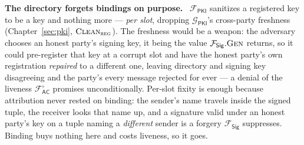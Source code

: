 \documentclass[10pt,oneside,openany]{book}
\newcommand{\op}[1]{\textnormal{\textsc{#1}}}
\newcommand{\Fsig}{\mathcal{F}_{\mathsf{Sig}}}
\newcommand{\Gpki}{\mathcal{G}_{\mathsf{PKI}}}
\newcommand{\Facz}{\mathcal{F}^{\circ}_{\mathsf{AC}}}
\newcommand{\Fpki}{\mathcal{F}_{\mathsf{PKI}}}
\newcommand{\Clean}{\op{Clean}}
\newcommand{\heading}[1]{\medskip\par\noindent\textcolor{accent}{\textbf{#1.}}\ }
\theoremstyle{accentdef}
\theoremstyle{accentplain}
\begin{document}
\heading{The directory forgets bindings on purpose} $\Fpki$ sanitizes a registered key to be a
key and nothing more --- \emph{per slot}, dropping $\Gpki$'s cross-party freshness
(Chapter~\ref{sec:pki}, $\Clean_{\op{reg}}$). The freshness would be a weapon: the adversary
chooses an honest party's signing key, it being the value $\Fsig.\op{Gen}$ returns, so it could
pre-register that key at a corrupt slot and have the honest party's own registration
\emph{repaired} to a different one, leaving directory and signing key disagreeing and the party's
every message rejected for ever --- a denial of the liveness $\Facz$ promises unconditionally.
Per-slot fixity is enough because attribution never rested on binding: the sender's name travels
inside the signed tuple, the receiver looks that name up, and a signature valid under an honest
party's key on a tuple naming a \emph{different} sender is a forgery $\Fsig$ suppresses. Binding
buys nothing here and costs liveness, so it goes.
\end{document}
